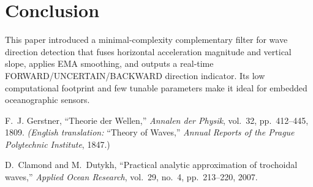 \documentclass[11pt,letterpaper]{article}
\begin{document}
\section{Conclusion}
This paper introduced a minimal‐complexity complementary filter for wave direction detection that fuses horizontal acceleration magnitude and vertical slope, applies EMA smoothing, and outputs a real‐time FORWARD/UNCERTAIN/BACKWARD direction indicator.  Its low computational footprint and few tunable parameters make it ideal for embedded oceanographic sensors.

\begin{thebibliography}{9}
F.~J. Gerstner, ``Theorie der Wellen,'' 
\emph{Annalen der Physik}, vol.~32, pp.~412–445, 1809.  
\emph{(English translation: }``Theory of Waves,'' \emph{Annual Reports of the Prague Polytechnic Institute}, 1847.)

D.~Clamond and M.~Dutykh, ``Practical analytic approximation of trochoidal waves,'' 
\emph{Applied Ocean Research}, vol.~29, no.~4, pp.~213–220, 2007.
\end{thebibliography}
\end{document}
